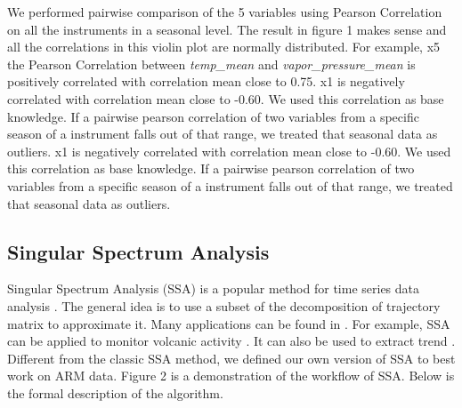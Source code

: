 \documentclass[letterpaper, 10 pt, conference]{ieeeconf}  %
\begin{document}
We performed pairwise comparison of the 5 variables using Pearson Correlation on all the instruments in a seasonal level. The result in figure 1 makes sense and all the correlations in this violin plot are normally distributed. For example, x5 the Pearson Correlation between \textit{temp\_mean} and \textit{vapor\_pressure\_mean} is positively correlated with correlation mean close to 0.75. x1 is negatively correlated with correlation mean close to -0.60. We used this correlation as base knowledge. If a pairwise pearson correlation of two variables from a specific season of a instrument falls out of that range, we treated that seasonal data as outliers.
x1 is negatively correlated with correlation mean close to -0.60. We used this correlation as base knowledge. If a pairwise pearson correlation of two variables from a specific season of a instrument falls out of that range, we treated that seasonal data as outliers.

\subsection{Singular Spectrum Analysis}
Singular Spectrum Analysis (SSA) is a popular method for time series data analysis \cite{golyandina2013singular, golyandina2014basic}. The general idea is to use a subset of the decomposition of trajectory matrix to approximate it. Many applications can be found in \cite{golyandina2013singular}. For example, SSA can be applied to monitor volcanic activity \cite{bozzo2010relationship}. It can also be used to extract trend \cite{alexandrov2008method}. Different from the classic SSA method, we defined our own version of SSA to best work on ARM data. Figure 2 is a demonstration of the workflow of SSA. Below is the formal description of the algorithm.
\end{document}
